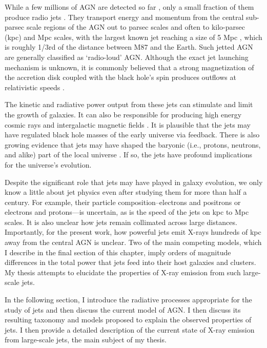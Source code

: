 While a few millions of AGN are detected so far \citep[e.g.,][]{Assef_2018}, only a small fraction of them produce radio jets \citep[e.g.,][]{ivezic2002optical,Padovani_2017}. They transport energy and momentum from the central sub-parsec scale regions of the AGN out to parsec scales and often to kilo-parsec (kpc) and Mpc scales, with the largest known jet reaching a size of 5 Mpc \citep{2022arXiv220205427O}, which is roughly 1/3rd of the distance between M87 and the Earth. Such jetted AGN are generally classified as `radio-loud' AGN. Although the exact jet launching mechanism is unknown, it is commonly believed that a strong magnetization of the accretion disk coupled with the black hole's spin produces outflows at relativistic speeds \citep[][]{blandford2019relativistic}.

The kinetic and radiative power output from these jets can stimulate and limit the growth of galaxies. It can also be responsible for producing high energy cosmic rays and intergalactic magnetic fields \citep[for a recent review, see][]{blandford2019relativistic}. It is plausible that the jets may have regulated black hole masses of the early universe \citep{churazov2005supermassive} via feedback. There is also growing evidence that jets may have shaped the baryonic (i.e., protons, neutrons, and alike) part of the local universe  \citep[][]{fabian2012observational}. If so, the jets have profound implications for the universe's evolution.

Despite the significant role that jets may have played in galaxy evolution, we only know a little about jet physics even after studying them for more than half a century. For example, 
their particle composition--electrons and positrons or electrons and protons---is uncertain, as is the speed of the jets on kpc to Mpc scales. It is also unclear how jets remain collimated across large distances. Importantly, for the present work,  how powerful jets emit X-rays hundreds of kpc away from the central AGN is unclear. Two of the main competing models, which I describe in the final section of this chapter, imply orders of magnitude differences in the total power that jets feed into their host galaxies and clusters. My thesis attempts to elucidate the properties of X-ray emission from such large-scale jets.

In the following section, I introduce the radiative processes appropriate for the study of jets and then discuss the current model of AGN. I then discuss its resulting taxonomy and models proposed to explain the observed properties of jets. I then provide a detailed description of the current state of X-ray emission from large-scale jets, the main subject of my thesis.

